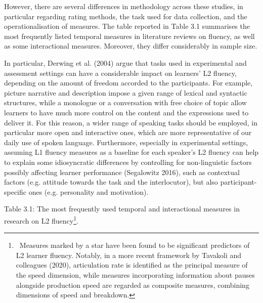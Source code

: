 \begin{styleStandard}
However, there are several differences in methodology across these studies, in particular regarding rating methods, the task used for data collection, and the operationalisation of measures. The table reported in Table 3.1 summarises the most frequently listed temporal measures in literature reviews on fluency, as well as some interactional measures. Moreover, they differ considerably in sample size.
\end{styleStandard}

\begin{styleStandard}
In particular, Derwing et al. (2004) argue that tasks used in experimental and assessment settings can have a considerable impact on learners’ L2 fluency, depending on the amount of freedom accorded to the participants. For example, picture narrative and description impose a given range of lexical and syntactic structures, while a monologue or a conversation with free choice of topic allow learners to have much more control on the content and the expressions used to deliver it. For this reason, a wider range of speaking tasks should be employed, in particular more open and interactive ones, which are more representative of our daily use of spoken language. Furthermore, especially in experimental settings, assuming L1 fluency measures as a baseline for each speaker’s L2 fluency can help to explain some idiosyncratic differences by controlling for non-linguistic factors possibly affecting learner performance (Segalowitz 2016), such as contextual factors (e.g. attitude towards the task and the interlocutor), but also participant-specific ones (e.g. personality and motivation).
\end{styleStandard}

\begin{stylelsTableHeading}
Table 3.1: The most frequently used temporal and interactional measures in research on L2 fluency\footnote{\ Measures marked by a star have been found to be significant predictors of L2 learner fluency. Notably, in a more recent framework by Tavakoli and colleagues (2020), articulation rate is identified as the principal measure of the speed dimension, while measures incorporating information about pauses alongside production speed are regarded as composite measures, combining dimensions of speed and breakdown.\newline
}. 
\end{stylelsTableHeading}


